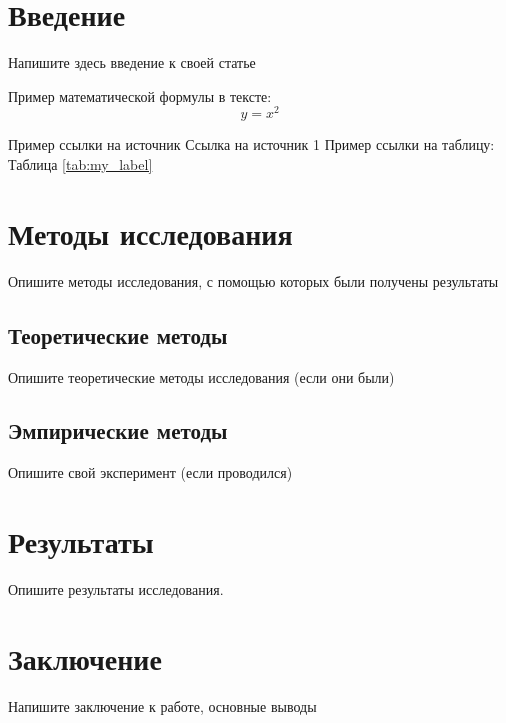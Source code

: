
%                           
\section*{ Введение}
\par Напишите здесь введение к своей статье

Пример математической формулы в тексте:
\begin{equation}
    y = x^2
\end{equation}

Пример ссылки на источник \cite{b2} Ссылка на источник 1 \cite{b1}
Пример ссылки на таблицу: Таблица \ref{tab:my_label} %
\section*{ Методы исследования}
\par Опишите методы исследования, с помощью которых были получены результаты
\subsection*{Теоретические методы}
Опишите теоретические методы исследования (если они были)
\subsection*{Эмпирические методы}
Опишите свой эксперимент (если проводился)

\section*{Результаты}
Опишите результаты исследования.

\section*{Заключение}
Напишите заключение к работе, основные выводы
\clearpage
%

